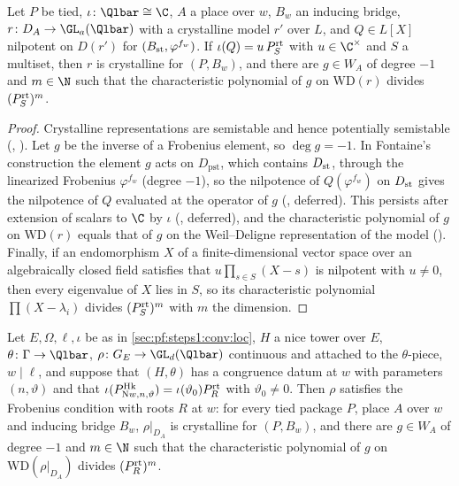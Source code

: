 \begin{proposition}\label{pf:steps1:niltophi}
Let $P$ be tied, $\iota\colon\Qlbar\cong\C$, $A$ a place over $w$, $B_w$ an inducing bridge, $r\colon D_A\to\GL_a(\Qlbar)$ with a
crystalline model $r'$ over $L$, and $Q\in L[X]$ nilpotent on $D(r')$ for $(B_{\mathrm{st}},\varphi^{f_w})$. If
$\iota(Q)=u\,P^{\mathrm{rt}}_S$ with $u\in\C^\times$ and $S$ a multiset, then $r$ is crystalline for $(P,B_w)$, and there are $g\in W_A$
of degree $-1$ and $m\in\N$ such that the characteristic polynomial of $g$ on $\mathrm{WD}(r)$ divides $(P^{\mathrm{rt}}_S)^m$.
\end{proposition}

\begin{proof}
Crystalline representations are semistable and hence potentially semistable
(, ). Let $g$ be the
inverse of a Frobenius element, so $\deg g=-1$. In Fontaine's construction the element $g$ acts on $D_{\mathrm{pst}}$, which
contains $D_{\mathrm{st}}$, through the linearized Frobenius $\varphi^{f_w}$ (degree $-1$), so the nilpotence of $Q(\varphi^{f_w})$ on
$D_{\mathrm{st}}$ gives the nilpotence of $Q$ evaluated at the operator of $g$
(, deferred). This persists after extension of scalars to $\C$ by
$\iota$ (, deferred), and the characteristic polynomial of $g$ on
$\mathrm{WD}(r)$ equals that of $g$ on the Weil--Deligne representation of the model
(). Finally, if an endomorphism $X$ of a finite-dimensional vector space
over an algebraically closed field satisfies that $u\prod_{s\in S}(X-s)$ is nilpotent with $u\ne0$, then every eigenvalue of $X$ lies
in $S$, so its characteristic polynomial $\prod(X-\lambda_i)$ divides $(P^{\mathrm{rt}}_S)^m$ with $m$ the dimension.
\end{proof}

\begin{theorem}\label{pf:steps1:phi}
Let $E,\Omega,\ell,\iota$ be as in \cref{sec:pf:steps1:conv:loc}, $H$ a nice tower over $E$, $\theta\colon\Gamma\to\Qlbar$,
$\rho\colon G_E\to\GL_d(\Qlbar)$ continuous and attached to the $\theta$-piece, $w\mid\ell$, and suppose that $(H,\theta)$ has a congruence
datum at $w$ with parameters $(n,\vartheta)$ and that $\iota(P^{\mathrm{Hk}}_{\mathrm{N}w,n,\vartheta})=\iota(\vartheta_0)P^{\mathrm{rt}}_R$ with
$\vartheta_0\ne0$. Then $\rho$ satisfies the Frobenius condition with roots $R$ at $w$: for every tied package $P$, place $A$ over $w$
and inducing bridge $B_w$, $\rho|_{D_A}$ is crystalline for $(P,B_w)$, and there are $g\in W_A$ of degree $-1$ and $m\in\N$ such that
the characteristic polynomial of $g$ on $\mathrm{WD}(\rho|_{D_A})$ divides $(P^{\mathrm{rt}}_R)^m$.
\end{theorem}

